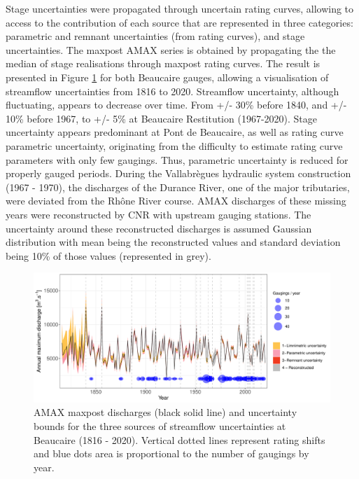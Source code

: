 \documentclass[11pt]{article}
\begin{document}
    Stage uncertainties were propagated through uncertain rating curves, allowing to access to the contribution of each source that are represented in three categories: parametric and remnant uncertainties (from rating curves), and stage uncertainties. The maxpost AMAX series is obtained by propagating the the median of stage realisations through maxpost rating curves. The result is presented in Figure \ref{fig:ICtot_both} for both Beaucaire gauges, allowing a visualisation of streamflow uncertainties from 1816 to 2020. Streamflow uncertainty, although fluctuating, appears to decrease over time. From +/- 30\% before 1840, and +/- 10\% before 1967, to +/- 5\% at Beaucaire Restitution (1967-2020). Stage uncertainty appears predominant at Pont de Beaucaire, as well as rating curve parametric uncertainty, originating from the difficulty to estimate rating curve parameters with only few gaugings. Thus, parametric uncertainty is reduced for properly gauged periods. During the Vallabrègues hydraulic system construction (1967 - 1970), the discharges of the Durance River, one of the major tributaries, were deviated from the Rhône River course. AMAX discharges of these missing years were reconstructed by CNR with upstream gauging stations. The uncertainty around these reconstructed discharges is assumed Gaussian distribution with mean being the reconstructed values and standard deviation being 10\% of those values (represented in grey).
    
    \begin{figure}[h!]
        \centering
        \includegraphics[width=\textwidth]{Figs/9-IC_AMAX_Both.pdf}
        \caption{AMAX maxpost discharges (black solid line) and uncertainty bounds for the three sources of streamflow uncertainties at Beaucaire (1816 - 2020). Vertical dotted lines represent rating shifts and blue dots area is proportional to the number of gaugings by year.}
        \label{fig:ICtot_both}
    \end{figure}
    
\end{document}
